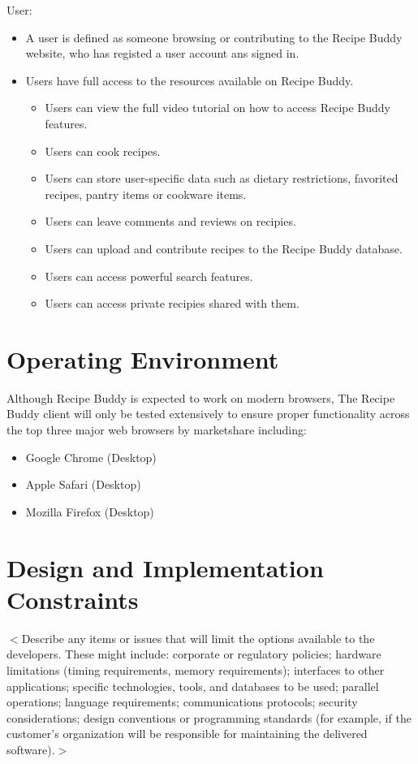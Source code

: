 \documentclass{scrreprt}
\begin{document}
User:
\begin{itemize}
    \item A user is defined as someone browsing or contributing to the Recipe Buddy website, who has registed a user account ans signed in.
    \item Users have full access to the resources available on Recipe Buddy.
          \begin{itemize}
              \item Users can view the full video tutorial on how to access Recipe Buddy features.
              \item Users can cook recipes.
              \item Users can store user-specific data such as dietary restrictions, favorited recipes, pantry items or cookware items.
              \item Users can leave comments and reviews on recipies.
              \item Users can upload and contribute recipes to the Recipe Buddy database.
              \item Users can access powerful search features.
              \item Users can access private recipies shared with them.
          \end{itemize}
\end{itemize}

\section{Operating Environment}
Although Recipe Buddy is expected to work on modern browsers, The Recipe Buddy client will only be tested extensively to ensure proper functionality across the top three major web browsers by marketshare including:
\begin{itemize}
    \item Google Chrome (Desktop)
    \item Apple Safari (Desktop)
    \item Mozilla Firefox (Desktop)
\end{itemize}

\section{Design and Implementation Constraints}
$<$Describe any items or issues that will limit the options available to the 
developers. These might include: corporate or regulatory policies; hardware 
limitations (timing requirements, memory requirements); interfaces to other 
applications; specific technologies, tools, and databases to be used; parallel 
operations; language requirements; communications protocols; security 
considerations; design conventions or programming standards (for example, if the 
customer’s organization will be responsible for maintaining the delivered 
software).$>$
\end{document}
